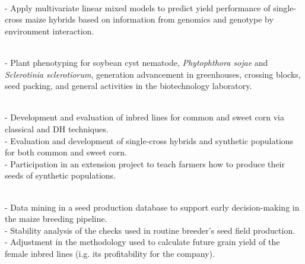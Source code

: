 \documentclass[]{mdkrause_cv_openfont}
\begin{document}
\begin{minipage}[t]{1\textwidth}
\sectionsep
\vspace{0.2 mm}

 \\
- Apply multivariate linear mixed models to predict yield performance of single-cross maize hybrids based on information from genomics and genotype by environment interaction. 

\sectionsep
\vspace{0.2 mm}

 \\
- Plant phenotyping for soybean cyst nematode, \textit{Phytophthora sojae} and \textit{Sclerotinia sclerotiorum}, generation advancement in greenhouses, crossing blocks, seed packing, and general activities in the biotechnology laboratory.

\sectionsep
\vspace{0.2 mm}

 \\
- Development and evaluation of inbred lines for common and sweet corn via classical and DH techniques. \\
- Evaluation and development of single-cross hybrids and synthetic populations for both common and sweet corn. \\
- Participation in an extension project to teach farmers how to produce their seeds of synthetic populations.

\sectionsep
\vspace{0.2 mm}

 \\
- Data mining in a seed production database to support early decision-making in the maize breeding pipeline. \\
- Stability analysis of the checks used in routine breeder's seed field production. \\
- Adjustment in the methodology used to calculate future grain yield of the female inbred lines (i.g. its profitability for the company). 


\end{minipage} 
\hfill
\end{document}
